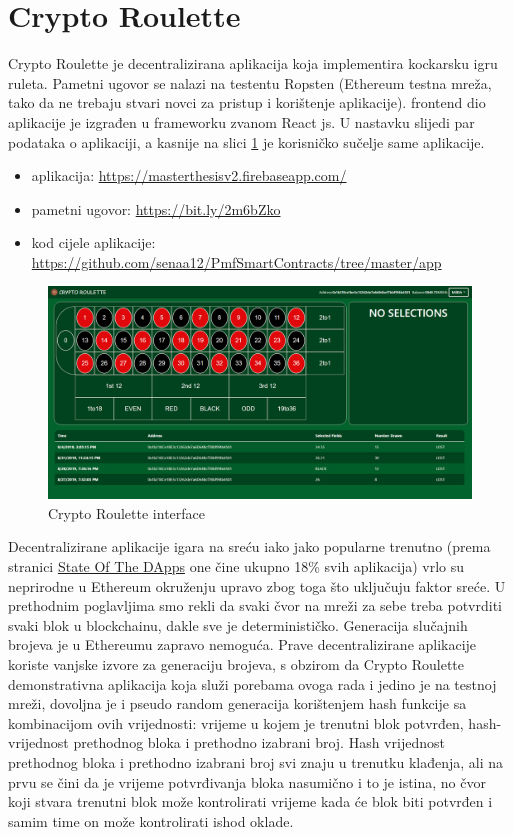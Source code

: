 \documentclass[a4paper,oneside,12pt]{memoir} %
\begin{document}
\section{Crypto Roulette}

Crypto Roulette je decentralizirana aplikacija koja implementira kockarsku igru ruleta. Pametni ugovor se nalazi na testentu Ropsten (Ethereum testna mreža, tako da ne trebaju stvari novci za pristup i korištenje aplikacije). frontend dio aplikacije je izgrađen u frameworku zvanom React js. U nastavku slijedi par podataka o aplikaciji, a kasnije na slici \ref{fig:crypto} je korisničko sučelje same aplikacije. 

\begin{itemize}
    \item aplikacija: \url{https://masterthesisv2.firebaseapp.com/}
    \item pametni ugovor: \url{https://bit.ly/2m6bZko}
    \item kod cijele aplikacije: \url{https://github.com/senaa12/PmfSmartContracts/tree/master/app}
\end{itemize}

\begin{figure}[H]
\centering
\includegraphics[scale=0.3]{screenshot}
\caption{Crypto Roulette interface}
\label{fig:crypto}
\end{figure}

Decentralizirane aplikacije igara na sreću iako jako popularne trenutno (prema stranici \href{https://www.stateofthedapps.com/}{State Of The DApps} one čine ukupno 18\% svih aplikacija) vrlo su neprirodne u Ethereum okruženju upravo zbog toga što uključuju faktor sreće. U prethodnim poglavljima smo rekli da svaki čvor na mreži za sebe treba potvrditi svaki blok u blockchainu, dakle sve je determinističko. Generacija slučajnih brojeva je u Ethereumu zapravo nemoguća. Prave decentralizirane aplikacije koriste vanjske izvore za generaciju brojeva, s obzirom da Crypto Roulette demonstrativna aplikacija koja služi porebama ovoga rada i jedino je na testnoj mreži, dovoljna je i pseudo random generacija korištenjem hash funkcije sa kombinacijom ovih vrijednosti: vrijeme u kojem je trenutni blok potvrđen, hash-vrijednost prethodnog bloka i prethodno izabrani broj. Hash vrijednost prethodnog bloka i prethodno izabrani broj svi znaju u trenutku klađenja, ali na prvu se čini da je vrijeme potvrđivanja bloka nasumično i to je istina, no čvor koji stvara trenutni blok može kontrolirati vrijeme kada će blok biti potvrđen i samim time on može kontrolirati ishod oklade.
\end{document}
